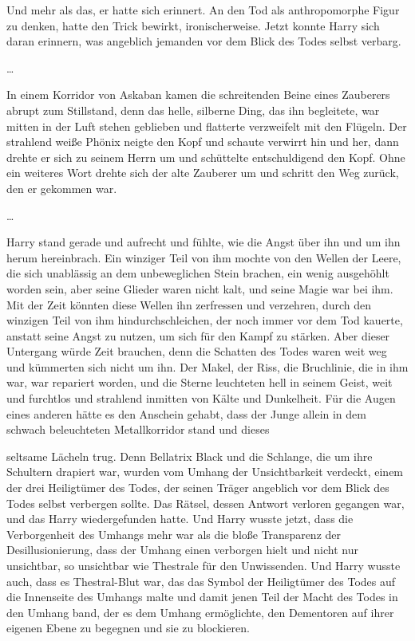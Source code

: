 {Und mehr als das, er hatte sich erinnert. An den Tod als anthropomorphe Figur zu denken, hatte den Trick bewirkt, ironischerweise. Jetzt konnte Harry sich daran erinnern, was angeblich jemanden vor dem Blick des Todes selbst verbarg.

…

In einem Korridor von Askaban kamen die schreitenden Beine eines Zauberers abrupt zum Stillstand, denn das helle, silberne Ding, das ihn begleitete, war mitten in der Luft stehen geblieben und flatterte verzweifelt mit den Flügeln. Der strahlend weiße Phönix neigte den Kopf und schaute verwirrt hin und her, dann drehte er sich zu seinem Herrn um und schüttelte entschuldigend den Kopf. Ohne ein weiteres Wort drehte sich der alte Zauberer um und schritt den Weg zurück, den er gekommen war.

…

Harry stand gerade und aufrecht und fühlte, wie die Angst über ihn und um ihn herum hereinbrach. Ein winziger Teil von ihm mochte von den Wellen der Leere, die sich unablässig an dem unbeweglichen Stein brachen, ein wenig ausgehöhlt worden sein, aber seine Glieder waren nicht kalt, und seine Magie war bei ihm. Mit der Zeit könnten diese Wellen ihn zerfressen und verzehren, durch den winzigen Teil von ihm hindurchschleichen, der noch immer vor dem Tod kauerte, anstatt seine Angst zu nutzen, um sich für den Kampf zu stärken. Aber dieser Untergang würde Zeit brauchen, denn die Schatten des Todes waren weit weg und kümmerten sich nicht um ihn. Der Makel, der Riss, die Bruchlinie, die in ihm war, war repariert worden, und die Sterne leuchteten hell in seinem Geist, weit und furchtlos und strahlend inmitten von Kälte und Dunkelheit. Für die Augen eines anderen hätte es den Anschein gehabt, dass der Junge allein in dem schwach beleuchteten Metallkorridor stand und dieses

seltsame Lächeln trug. Denn Bellatrix Black und die Schlange, die um ihre Schultern drapiert war, wurden vom Umhang der Unsichtbarkeit verdeckt, einem der drei Heiligtümer des Todes, der seinen Träger angeblich vor dem Blick des Todes selbst verbergen sollte. Das Rätsel, dessen Antwort verloren gegangen war, und das Harry wiedergefunden hatte. Und Harry wusste jetzt, dass die Verborgenheit des Umhangs mehr war als die bloße Transparenz der Desillusionierung, dass der Umhang einen verborgen hielt und nicht nur unsichtbar, so unsichtbar wie Thestrale für den Unwissenden. Und Harry wusste auch, dass es Thestral-Blut war, das das Symbol der Heiligtümer des Todes auf die Innenseite des Umhangs malte und damit jenen Teil der Macht des Todes in den Umhang band, der es dem Umhang ermöglichte, den Dementoren auf ihrer eigenen Ebene zu begegnen und sie zu blockieren.

}
